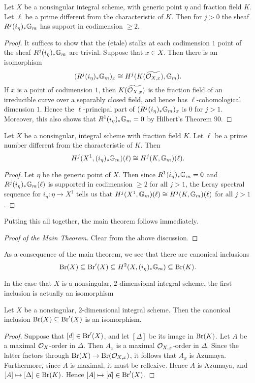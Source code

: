 \begin{lem}
Let $X$ be a nonsingular integral scheme, with generic point $\eta$ and fraction field $K$.  Let $\ell$ be a prime different from the characteristic of $K$.  Then for $j>0$ the sheaf $R^j(i_\eta)_*\mathbb{G}_m$ has support in codimension $\geq 2$.
\end{lem}
\begin{proof}
It suffices to show that the (etale) stalks at each codimension $1$ point of the sheaf $R^j(i_\eta)_*\mathbb{G}_m$ are trivial.  Suppose that $x\in X$.  Then there is an isomorphism
$$(R^j(i_\eta)_*\mathbb{G}_m)_x\cong H^j(K(\widetilde{\mathcal{O}_{X,x}}),\mathbb{G}_m).$$
If $x$ is a point of codimension $1$, then $K(\widetilde{\mathcal{O}_{X,x}})$ is the fraction field of an irreducible curve over a separably closed field, and hence has $\ell$-cohomological dimension $1$.  Hence the $\ell$-principal part of $(R^j(i_\eta)_*\mathbb{G}_m)_x$ is $0$ for $j>1$.  Moreover, this also shows that $R^1(i_\eta)_*\mathbb{G}_m = 0$ by Hilbert's Theorem 90.
\end{proof}

\begin{lem}
Let $X$ be a nonsingular, integral scheme with fraction field $K$.  Let $\ell$ be a prime number different from the characteristic of $K$.  Then
$$H^j(X^1,(i_\eta)_*\mathbb{G}_m)(\ell)\cong H^j(K,\mathbb{G}_m)(\ell).$$
\end{lem}
\begin{proof}
Let $\eta$ be the generic point of $X$.  Then since $R^1(i_\eta)_*\mathbb{G}_m = 0$ and $R^j(i_\eta)_*\mathbb{G}_m(\ell)$ is supported in codimension $\geq 2$ for all $j>1$, the Leray spectral sequence for $i_\eta: \eta\rightarrow X^1$ tells us that $H^j(X^1,\mathbb{G}_m)(\ell)\cong H^j(K,\mathbb{G}_m)(\ell)$ for all $j>1$.
\end{proof}

Putting this all together, the main theorem follows immediately.
\begin{proof}[Proof of the Main Theorem]
Clear from the above discussion.
\end{proof}

As a consequence of the main theorem, we see that there are canonical inclusions
$$\textnormal{Br}(X)\subseteq \textnormal{Br}'(X)\subseteq H^2(X,(i_\eta)_*\mathbb{G}_m)\subseteq \textnormal{Br}(K).$$

In the case that $X$ is a nonsingular, $2$-dimensional integral scheme, the first inclusion is actually an isomorphism
\begin{prop}
Let $X$ be a nonsingular, $2$-dimensional integral scheme.  Then the canonical inclusion $\textnormal{Br}(X)\subseteq \textnormal{Br}'(X)$ is an isomorphism.
\end{prop}
\begin{proof}
Suppose that $[d]\in \textnormal{Br}'(X)$, and let $[\Delta]$ be its image in $\textnormal{Br}(K)$.  Let $A$ be a maximal $\mathcal{O}_X$-order in $\Delta$.  Then $A_x$ is a maximal $\mathcal{O}_{X,x}$-order in $\Delta$.  Since the latter factors through $\textnormal{Br}(X)\rightarrow\textnormal{Br}(\mathcal{O}_{X,x})$, it follows that $A_x$ is Azumaya.  Furthermore, since $A$ is maximal, it must be reflexive.  Hence $A$ is Azumaya, and $[A]\mapsto [\Delta]\in \textnormal{Br}(K)$.  Hence $[A]\mapsto [d]\in \textnormal{Br}'(X)$.
\end{proof}

